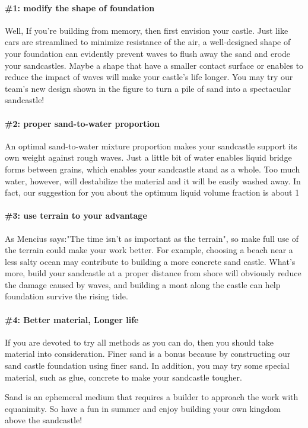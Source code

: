 \documentclass[12pt]{article}
\begin{document}
\paragraph{\#1: modify the shape of foundation}
Well, If you’re building from memory, then first envision your castle. Just like cars are streamlined to minimize resistance of the air, a well-designed shape of your foundation can evidently prevent waves to flush away the sand and erode your sandcastles. Maybe a shape that have a smaller contact surface or enables to reduce the impact of waves will make your castle's life longer. You may try our team's new design shown in the figure to turn a pile of sand into a spectacular sandcastle!
\paragraph{\#2: proper sand-to-water proportion}
An optimal sand-to-water mixture proportion makes your sandcastle support its own weight against rough waves. Just a little bit of water enables liquid bridge forms between grains, which enables your sandcastle stand as a whole. Too much water, however, will destabilize the material and it will be easily washed away. In fact, our suggestion for you about the optimum liquid volume fraction is about 1%
\paragraph{\#3: use terrain to your advantage}
As Mencius says:"The time isn't as important as the terrain", so make full use of the terrain could make your work better. For example, choosing a beach near a less salty ocean may contribute to building a more concrete sand castle. What's more, build your sandcastle at a proper distance from shore will obviously reduce the damage caused by waves, and building a moat along the castle can help foundation survive the rising tide. 
\paragraph{\#4: Better material, Longer life}
If you are devoted to try all methods as you can do, then you should take material into consideration. Finer sand is a bonus because by constructing our sand castle foundation using finer sand. In addition, you may try some special material, such as glue, concrete to make your sandcastle tougher.
\par
Sand is an ephemeral medium that requires a builder to approach the work with equanimity. So have a fun in summer and enjoy building your own kingdom above the sandcastle!
\newpage
\end{document}
